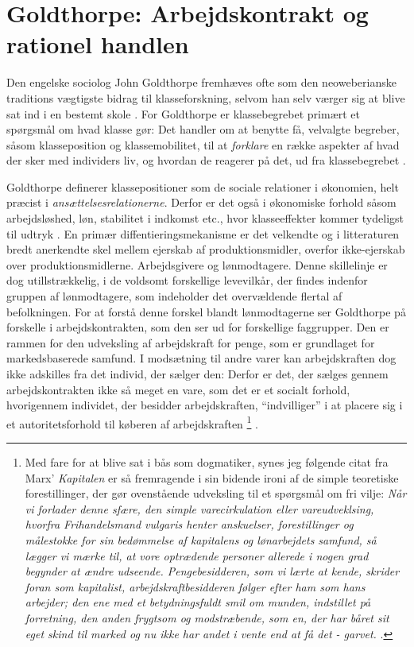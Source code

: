 \section{Goldthorpe: Arbejdskontrakt og rationel handlen \label{kap_klasse_Goldthorpe}}


Den engelske sociolog John Goldthorpe fremhæves ofte som den neoweberianske traditions vægtigste bidrag til klasseforskning, selvom han selv værger sig at blive sat ind i en bestemt skole \parencite[90]{Harrits2014}. 
For Goldthorpe er klassebegrebet primært et spørgsmål om hvad klasse gør: Det handler om at benytte få, velvalgte begreber, såsom klasseposition og klassemobilitet, til at \emph{forklare} en række aspekter af hvad der sker med individers liv, og hvordan de reagerer på det, ud fra klassebegrebet \parencite[382]{GoldthorpeMarshall1992}. 

Goldthorpe definerer klassepositioner som de sociale relationer i økonomien, helt præcist i \emph{ansættelsesrelationerne}. Derfor er det også i økonomiske forhold såsom arbejdsløshed, løn, stabilitet i indkomst etc., hvor klasseeffekter kommer tydeligst til udtryk \parencite[1]{GoldthorpeMcKnight2004}. En primær diffentieringsmekanisme er det velkendte og i litteraturen bredt anerkendte skel mellem ejerskab af produktionsmidler, overfor ikke-ejerskab over produktionsmidlerne. Arbejdsgivere og lønmodtagere. Denne skillelinje er dog utillstrækkelig, i de voldsomt forskellige levevilkår, der findes indenfor gruppen af lønmodtagere, som indeholder det overvældende flertal af befolkningen. 
For at forstå denne forskel blandt lønmodtagerne ser Goldthorpe på forskelle i arbejdskontrakten, som den ser ud for forskellige faggrupper. Den er rammen for den udveksling af arbejdskraft for penge, som er grundlaget for markedsbaserede samfund. I modsætning til andre varer kan arbejdskraften dog ikke adskilles fra det individ, der sælger den: Derfor er det, der sælges gennem arbejdskontrakten ikke så meget en vare, som det er et socialt forhold, hvorigennem individet, der besidder arbejdskraften, “indvilliger” i at placere sig i et autoritetsforhold til køberen af arbejdskraften%
%
\footnote{ Med fare for at blive sat i bås som dogmatiker, synes jeg følgende citat fra Marx' \emph{Kapitalen} er så fremragende i sin bidende ironi af de simple teoretiske forestillinger, der gør ovenstående udveksling til et spørgsmål om fri vilje: \emph{Når vi forlader denne sfære, den simple varecirkulation eller vareudveklsing, hvorfra Frihandelsmand vulgaris henter anskuelser, forestillinger og målestokke for sin bedømmelse af kapitalens og lønarbejdets samfund, så lægger vi mærke til, at vore optrædende personer allerede i nogen grad begynder at ændre udseende. Pengebesidderen, som vi lærte at kende, skrider foran som kapitalist, arbejdskraftbesidderen følger efter ham som hans arbejder; den ene med et betydningsfuldt smil om munden, indstillet på forretning, den anden frygtsom og modstræbende, som en, der har båret sit eget skind til marked og nu ikke har andet i vente end at få det - garvet.} \parencite[293]{Marx1970}.}%
%
. 

